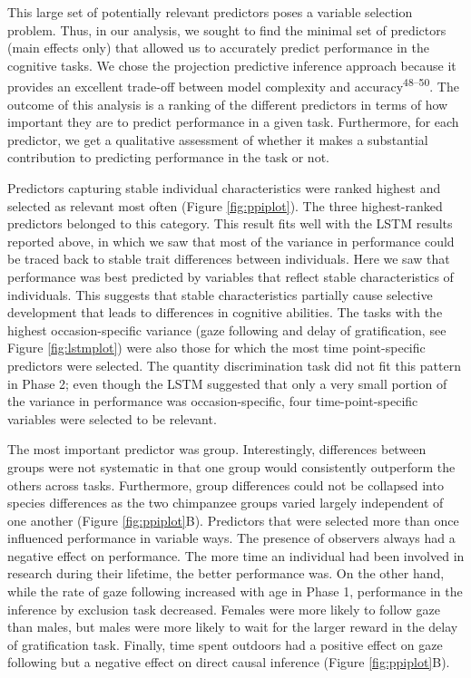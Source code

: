 \documentclass[
  man,floatsintext]{apa6}
\begin{document}
This large set of potentially relevant predictors poses a variable selection problem. Thus, in our analysis, we sought to find the minimal set of predictors (main effects only) that allowed us to accurately predict performance in the cognitive tasks. We chose the projection predictive inference approach because it provides an excellent trade-off between model complexity and accuracy\textsuperscript{48--50}. The outcome of this analysis is a ranking of the different predictors in terms of how important they are to predict performance in a given task. Furthermore, for each predictor, we get a qualitative assessment of whether it makes a substantial contribution to predicting performance in the task or not.

Predictors capturing stable individual characteristics were ranked highest and selected as relevant most often (Figure \ref{fig:ppiplot}). The three highest-ranked predictors belonged to this category. This result fits well with the LSTM results reported above, in which we saw that most of the variance in performance could be traced back to stable trait differences between individuals. Here we saw that performance was best predicted by variables that reflect stable characteristics of individuals. This suggests that stable characteristics partially cause selective development that leads to differences in cognitive abilities. The tasks with the highest occasion-specific variance (gaze following and delay of gratification, see Figure \ref{fig:lstmplot}) were also those for which the most time point-specific predictors were selected. The quantity discrimination task did not fit this pattern in Phase 2; even though the LSTM suggested that only a very small portion of the variance in performance was occasion-specific, four time-point-specific variables were selected to be relevant.

The most important predictor was group. Interestingly, differences between groups were not systematic in that one group would consistently outperform the others across tasks. Furthermore, group differences could not be collapsed into species differences as the two chimpanzee groups varied largely independent of one another (Figure \ref{fig:ppiplot}B). Predictors that were selected more than once influenced performance in variable ways. The presence of observers always had a negative effect on performance. The more time an individual had been involved in research during their lifetime, the better performance was. On the other hand, while the rate of gaze following increased with age in Phase 1, performance in the inference by exclusion task decreased. Females were more likely to follow gaze than males, but males were more likely to wait for the larger reward in the delay of gratification task. Finally, time spent outdoors had a positive effect on gaze following but a negative effect on direct causal inference (Figure \ref{fig:ppiplot}B).
\end{document}
